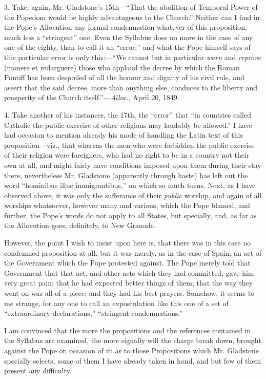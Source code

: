 3. Take, again, Mr. Gladstone's 15th—``That the abolition of
Temporal Power of the Popedom would be highly advantageous to the
Church.'' Neither can I find in the Pope's Allocution any formal
condemnation whatever of this proposition, much less a
``stringent'' one. Even the Syllabus does no more in the case of
any one of the eighty, than to call it an ``error;'' and what
the Pope himself says of this particular error is only this:—``We
cannot but in particular \emph{warn} and \emph{reprove} (monere et
redarguere) those who applaud the decree by which the Roman Pontiff has
been despoiled of all the honour and dignity of his civil rule,
and assert that the said decree, more than anything else, conduces to
the liberty and prosperity of the Church itself.''—\emph{Alloc}.,
April 20, 1849.

4. Take another of his instances, the 17th, the ``error''
that ``in countries called Catholic the public exercise of other
religions may laudably be allowed.'' I have had occasion to mention
already his mode of handling the Latin text of this proposition—viz.,
that whereas the men who were forbidden the public exercise of their
religion were foreigners, who had no right to be in a country not their
own at all, and might fairly have conditions imposed upon them during
their stay there, nevertheless Mr. Gladstone (apparently through haste)
has left out the word ``hominibus illuc immigrantibus,'' on
which so much turns. Next, as I have observed above, it was only the
sufferance of their \emph{public} worship, and again of all worships
whatsoever, however many and various, which the Pope blamed; and
further, the Pope's words do not apply to all States, but specially,
and, as far as the Allocution goes, definitely, to New Granada.

However, the point I wish to insist upon here is, that there was in
this case no condemned proposition at all, but it was merely, as in the
case of Spain, an act of the Government which the Pope protested
against. The Pope merely told that Government that that act, and other
acts which they had committed, gave him very great pain; that he had
expected better things of them; that the way they went on was all of a
piece; and they had his best prayers. Somehow, it seems to me strange,
for any one to call an expostulation like this one of a set of
``extraordinary declarations,'' ``stringent
condemnations.''

I am convinced that the more the propositions and the references
contained in the Syllabus are examined, the more signally will the
charge break down, brought against the Pope on occasion of it: as to
those Propositions which Mr. Gladstone specially selects, some of them I
have already taken in hand, and but few of them present any difficulty.

